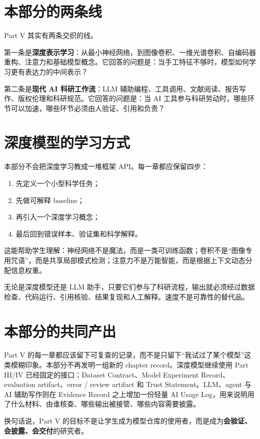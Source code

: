 \section*{本部分的两条线}

Part V 其实有两条交织的线。

第一条是\textbf{深度表示学习}：从最小神经网络，到图像卷积、一维光谱卷积、自编码器重构、注意力和基础模型概念。它回答的问题是：当手工特征不够时，模型如何学习更有表达力的中间表示？

第二条是\textbf{现代 AI 科研工作流}：LLM 辅助编程、工具调用、文献阅读、报告写作、版权伦理和科研规范。它回答的问题是：当 AI 工具参与科研劳动时，哪些环节可以加速，哪些环节必须由人验证、引用和负责？

\section*{深度模型的学习方式}

本部分不会把深度学习教成一堆框架 API。每一章都应保留四步：

\begin{enumerate}
    \item 先定义一个小型科学任务；
    \item 先做可解释 baseline；
    \item 再引入一个深度学习概念；
    \item 最后回到错误样本、验证集和科学解释。
\end{enumerate}

这能帮助学生理解：神经网络不是魔法，而是一类可训练函数；卷积不是“图像专用咒语”，而是共享局部模式检测；注意力不是万能智能，而是根据上下文动态分配信息权重。

\begin{warnbox}[现代 AI 不能绕过验证]
无论是深度模型还是 LLM 助手，只要它们参与了科研流程，输出就必须经过数据检查、代码运行、引用核验、结果复现和人工解释。速度不是可靠性的替代品。
\end{warnbox}

\section*{本部分的共同产出}

Part V 的每一章都应该留下可复查的记录，而不是只留下“我试过了某个模型”这类模糊印象。本部分不再发明一组新的 chapter record。深度模型继续使用 Part III/IV 已经固定的接口：Dataset Contract、Model Experiment Record、evaluation artifact、error / review artifact 和 Trust Statement。LLM、agent 与 AI 辅助写作则在 Evidence Record 之上增加一份轻量 AI Usage Log，用来说明用了什么材料、由谁核查、哪些输出被接管、哪些内容需要披露。

换句话说，Part V 的目标不是让学生成为模型仓库的使用者，而是成为\textbf{会验证、会披露、会交付}的研究者。
